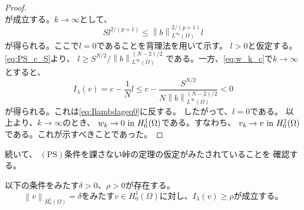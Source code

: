 \begin{proof}
\[ \]
 が成立する。$k \to \infty$として、
 \begin{equation}
  S l^{2/(p+1)} \leq \left\| b \right\|_{L^\infty(\Omega)}^{2/(p+1)} l 
   \label{eq:PS_c_S}
 \end{equation}
 が得られる。ここで$l = 0$であることを背理法を用いて示す。
 $l > 0$と仮定する。\eqref{eq:PS_c_S}より、
 $l \geq S^{N/2}/ \left\| b \right\|_{L^\infty(\Omega)}^{(N-2)/2}$
 である。一方、\eqref{eq:w_k_c}で$k \to \infty$とすると、
 \[
  I_\lambda(v) = c - \frac{1}{N}l \leq c - \frac{S^{N/2}}{N \left\| b
 \right\|_{L^\infty(\Omega)}^{(N-2)/2}} < 0
 \]
 が得られる。これは\eqref{eq:Ilambdageq0}に反する。
 したがって、$l = 0$である。
 以上より、$k \to \infty$のとき、
 $w_k \to 0 ~\text{in}~ H_0^1(\Omega)$である。すなわち、
 $v_k \to v ~\text{in}~ H_0^1(\Omega)$である。これが示すべきことであった。\qedhere
\end{proof}

続いて、
$(\mathrm{PS})$条件を課さない峠の定理の仮定がみたされていることを
確認する。

\begin{lem} \label{lem:delta_rho}
 以下の条件をみたす$\delta > 0$、$\rho > 0$が存在する。
 \begin{equation}
  \text{$\left\|v \right\|_{H^1_0(\Omega)} = \delta$をみたす$v \in
   H_0^1(\Omega)$に対し、$I_\lambda(v) \geq \rho$が成立する。} 
   \label{eq:delta_rho}
 \end{equation}
\end{lem}

